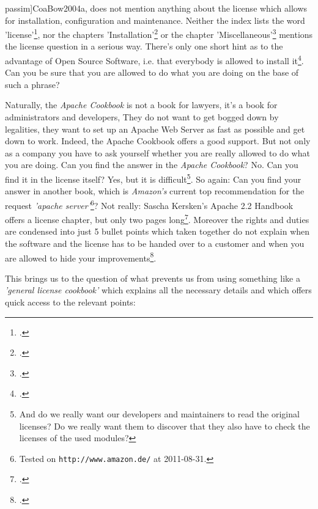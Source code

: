 passim]{CoaBow2004a}, does not mention anything about the license which allows
for installation, configuration and maintenance. Neither the index lists the
word 'license'\footcite[cf.][245ff, esp. p. 250]{CoaBow2004a}, nor the chapters
'Installation'\footcite[cf.][1ff]{CoaBow2004a} or the chapter
'Miscellaneous'\footcite[cf.][219ff]{CoaBow2004a} mentions the license question
in a serious way. There's only one short hint as to the advantage of Open Source
Software, i.e. that everybody is allowed to install it\footcite[cf.][1: \enquote{
\ldots einer der Vorzüge von Open Source Software besteht darin, dass
je\-der\-mann die Erlaubnis zur Erzeugung eines eigenen Installationskits hat
}]{CoaBow2004a}. Can you be sure that you are allowed to do what you are
doing on the base of such a phrase?

Naturally, the \emph{Apache Cookbook} is not a book for lawyers, it's a book for
administrators and developers, They do not want to get bogged down by
legalities, they want to set up an Apache Web Server as fast as possible and get
down to work. Indeed, the Apache Cookbook offers a good support. But not only as
a company you have to ask yourself whether you are really allowed to do what you
are doing. Can you find the answer in the \emph{Apache Cookbook}? No. Can you
find it in the license itself? Yes, but it is difficult\footnote{And do we really
want our developers and maintainers to read the original licenses? Do we really
want them to discover that they also have to check the licenses of the used
modules?}. So again: Can you find your answer in another book, which is
\emph{Amazon's} current top recommendation for the request \emph{'apache
server'}\footnote{Tested on \texttt{http://www.amazon.de/} at 2011-08-31.}? Not
really: Sascha Kersken's Apache 2.2 Handbook offers a license chapter, but only
two pages long\footcite[cf.][111f]{Kersken2009a}. Moreover the rights and duties
are condensed into just 5 bullet points which taken together do not explain when
the software and the license has to be handed over to a customer and when you
are allowed to hide your improvements\footcite[cf.][112]{Kersken2009a}.

This brings us to the question of what prevents us from using something like a
\emph{'general license cookbook'} which explains all the necessary details and which
offers  quick access to the relevant points:

%
